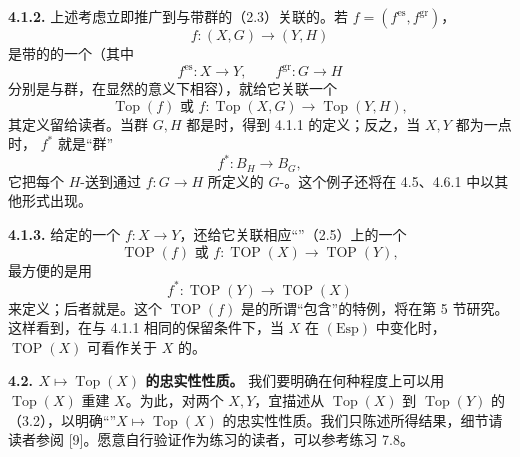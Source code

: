 \textbf{4.1.2.} 上述考虑立即推广到与带群的（2.3）关联的。若 $f=(f^{\mathrm{es}},f^{\mathrm{gr}})$，
\[
 f:(X,G)\longrightarrow(Y,H)
\]
是带的的一个（其中
\[
 f^{\mathrm{es}}:X\longrightarrow Y,\qquad f^{\mathrm{gr}}:G\longrightarrow H
\]
分别是与群，在显然的意义下相容），就给它关联一个
\[
 \operatorname{Top}(f)\text{ 或 }f:\operatorname{Top}(X,G)\longrightarrow\operatorname{Top}(Y,H),
\]
其定义留给读者。当群 $G,H$ 都是时，得到 4.1.1 的定义；反之，当 $X,Y$ 都为一点时， $f^*$ 就是“群”
\[
 f^*:B_H\longrightarrow B_G,
\]
它把每个 $H$-送到通过 $f:G\to H$ 所定义的 $G$-。这个例子还将在 4.5、4.6.1 中以其他形式出现。

\textbf{4.1.3.} 给定的一个 $f:X\to Y$，还给它关联相应“”（2.5）上的一个
\[
 \operatorname{TOP}(f)\text{ 或 }f:\operatorname{TOP}(X)\longrightarrow\operatorname{TOP}(Y),
\]
最方便的是用
\[
 f^*:\operatorname{TOP}(Y)\longrightarrow\operatorname{TOP}(X)
\]
来定义；后者就是。这个 $\operatorname{TOP}(f)$ 是的所谓“包含”的特例，将在第 5 节研究。这样看到，在与 4.1.1 相同的保留条件下，当 $X$ 在 $(\mathrm{Esp})$ 中变化时， $\operatorname{TOP}(X)$ 可看作关于 $X$ 的。

\textbf{4.2. $X\mapsto\operatorname{Top}(X)$ 的忠实性性质。} 我们要明确在何种程度上可以用 $\operatorname{Top}(X)$ 重建 $X$。为此，对两个 $X,Y$，宜描述从 $\operatorname{Top}(X)$ 到 $\operatorname{Top}(Y)$ 的（3.2），以明确“”$X\mapsto\operatorname{Top}(X)$ 的忠实性性质。我们只陈述所得结果，细节请读者参阅 [9]。愿意自行验证作为练习的读者，可以参考练习 7.8。

